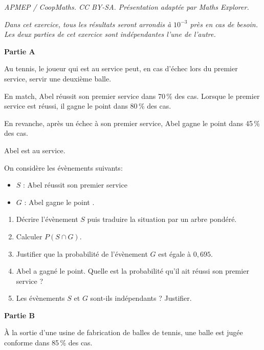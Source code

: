 \documentclass[10pt]{article}
\begin{document}
\noindent\textit{APMEP / CoopMaths. CC BY-SA. Présentation adaptée par Maths Explorer.}\par\medskip
\medskip

\emph{Dans cet exercice, tous les résultats seront arrondis à $10^{-3}$ près en cas de besoin.\\
Les deux parties de cet exercice sont indépendantes l'une de l'autre.}

\bigskip

\textbf{Partie A}

\medskip

Au tennis, le joueur qui est au service peut, en cas d'échec lors du premier service, servir une deuxième balle.

En match, Abel réussit son premier service dans 70\,\% des cas. Lorsque le premier service est réussi, il gagne le point dans 80\,\% des cas.

En revanche, après un échec à son premier service, Abel gagne
le point dans 45\,\% des cas.

\medskip

Abel est au service.

On considère les évènements suivants:

\begin{itemize}[label=$\bullet~~$]
\item $S$ : \og Abel réussit son premier service \fg
\item $G$ : \og Abel gagne le point \fg.
\end{itemize}

\medskip

\begin{enumerate}
\item Décrire l'évènement $S$ puis traduire la situation par un arbre pondéré.
\item Calculer $P(S \cap G)$.
\item Justifier que la probabilité de l'évènement $G$ est égale à $0,695$.
\item Abel a gagné le point. Quelle est la probabilité qu'il ait réussi son premier service ?
\item Les évènements $S$ et $G$ sont-ils indépendants ? Justifier.
\end{enumerate}

\textbf{Partie B}

\medskip

À la sortie d'une usine de fabrication de balles de tennis, une balle est jugée conforme dans 85\,\% des cas.
\end{document}
